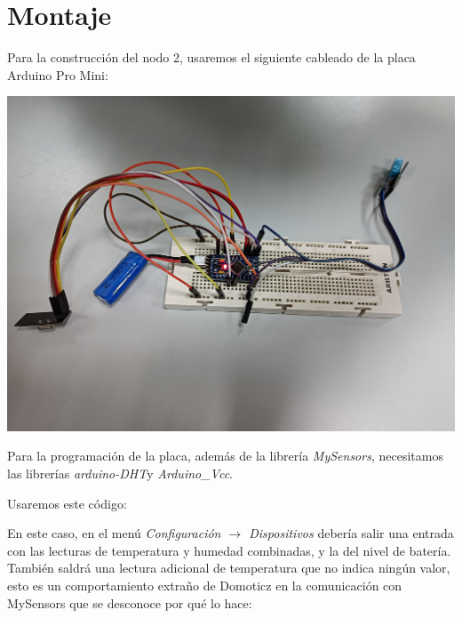 \section{Montaje}

Para la construcción del nodo 2, usaremos el siguiente cableado de la placa
Arduino Pro Mini:

\includegraphics[width=\linewidth]{nodo2/nodo2-wiring.jpg}

Para la programación de la placa, además de la librería \emph{MySensors},
necesitamos las librerías \emph{arduino-DHT}\footnotemark y
\emph{Arduino\_Vcc}\footnotemark.


Usaremos este código:



En este caso, en el menú \emph{Configuración $\rightarrow$ Dispositivos}
debería salir una entrada con las lecturas de temperatura y humedad combinadas,
y la del nivel de batería. También saldrá una lectura adicional de temperatura
que no indica ningún valor, esto es un comportamiento extraño de Domoticz en la
comunicación con MySensors que se desconoce por qué lo hace:

